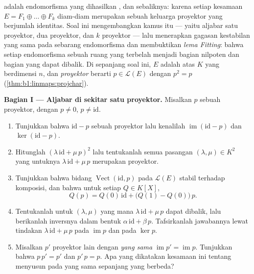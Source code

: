 \begin{problem}\label{pb:b1:linmaps:1}
 adalah endomorfisma yang dihasilkan , dan
sebaliknya: karena setiap kesamaan $E = F_1 \oplus \dots \oplus F_k$
diam-diam merupakan sebuah keluarga proyektor yang berjumlah identitas. Soal
ini mengembangkan kamus itu --- yaitu aljabar satu
proyektor, dua proyektor, dan $k$ proyektor --- lalu menerapkan gagasan
kestabilan yang sama pada sebarang endomorfisma dan membuktikan
\emph{lema Fitting}: bahwa setiap endomorfisma sebuah ruang yang
 terbelah menjadi bagian nilpoten dan
bagian yang dapat dibalik. Di sepanjang soal ini, $E$ adalah  atas $K$
yang berdimensi $n$, dan \emph{proyektor} berarti $p \in \mathcal{L}(E)$
dengan $p^2 = p$ (\cref{thm:b1:linmaps:projchar}).

\medskip
\noindent\textbf{Bagian I --- Aljabar di sekitar satu proyektor.}
Misalkan $p$ sebuah proyektor, dengan $p \neq 0$, $p \neq \mathrm{id}$.
\begin{enumerate}
  \item Tunjukkan bahwa $\mathrm{id} - p$ sebuah proyektor lalu kenalilah
        $\operatorname{im}(\mathrm{id} - p)$ dan
        $\ker(\mathrm{id} - p)$.
  \item Hitunglah $(\lambda\,\mathrm{id} + \mu\,p)^2$ lalu tentukanlah
        semua pasangan $(\lambda, \mu) \in K^2$ yang untuknya
        $\lambda\,\mathrm{id} + \mu\,p$ merupakan proyektor.
  \item Tunjukkan bahwa bidang $\operatorname{Vect}(\mathrm{id}, p)$
        pada $\mathcal{L}(E)$ stabil terhadap komposisi, dan bahwa
        untuk setiap  $Q \in K[X]$,
        \[
        Q(p) = Q(0)\,\mathrm{id} + \bigl(Q(1) -
        Q(0)\bigr)\,p .
        \]
  \item Tentukanlah untuk $(\lambda, \mu)$ yang mana 
        $\lambda\,\mathrm{id} + \mu\,p$ dapat dibalik, lalu berikanlah
        inversnya dalam bentuk $\alpha\,\mathrm{id} + \beta\,p$.
        Tafsirkanlah jawabannya lewat tindakan
        $\lambda\,\mathrm{id} + \mu\,p$ pada $\operatorname{im} p$
        dan pada $\ker p$.
  \item Misalkan $p'$ proyektor lain dengan \emph{ yang sama}
        $\operatorname{im} p' = \operatorname{im} p$. Tunjukkan bahwa
        $p\,p' = p'$ dan $p'\,p = p$. Apa yang dikatakan kesamaan ini
        tentang menyusun  pada  yang sama
        sepanjang  yang berbeda?
\end{enumerate}


\end{problem}
